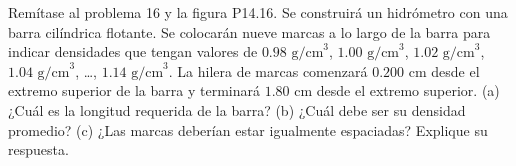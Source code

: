 \item Remítase al problema 16 y la figura P14.16. Se construirá un hidrómetro con una barra cilíndrica flotante. Se colocarán nueve marcas a lo largo de la barra para indicar densidades que tengan valores de $0.98 \text{ g/cm}^3$, $1.00 \text{ g/cm}^3$, $1.02 \text{ g/cm}^3$, $1.04 \text{ g/cm}^3$, \dots, $1.14 \text{ g/cm}^3$. La hilera de marcas comenzará $0.200 \text{ cm}$ desde el extremo superior de la barra y terminará $1.80 \text{ cm}$ desde el extremo superior. (a) ¿Cuál es la longitud requerida de la barra? (b) ¿Cuál debe ser su densidad promedio? (c) ¿Las marcas deberían estar igualmente espaciadas? Explique su respuesta.
